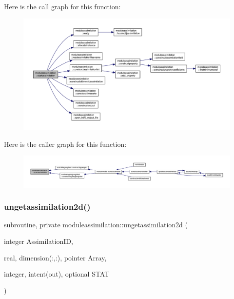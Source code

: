 Here is the call graph for this function\+:\nopagebreak
\begin{figure}[H]
\begin{center}
\leavevmode
\includegraphics[width=350pt]{namespacemoduleassimilation_a686ae542667f0f0269fb4baa108cbcf7_cgraph}
\end{center}
\end{figure}
Here is the caller graph for this function\+:\nopagebreak
\begin{figure}[H]
\begin{center}
\leavevmode
\includegraphics[width=350pt]{namespacemoduleassimilation_a686ae542667f0f0269fb4baa108cbcf7_icgraph}
\end{center}
\end{figure}
\mbox{\label{namespacemoduleassimilation_a3a9adb0b25404594ea0591b684a7c40e}} 
\subsubsection{\texorpdfstring{ungetassimilation2d()}{ungetassimilation2d()}}
{\footnotesize\ttfamily subroutine, private moduleassimilation\+::ungetassimilation2d (\begin{DoxyParamCaption}\item[{integer}]{Assimilation\+ID,  }\item[{real, dimension(\+:,\+:), pointer}]{Array,  }\item[{integer, intent(out), optional}]{S\+T\+AT }\end{DoxyParamCaption})\hspace{0.3cm}{\ttfamily [private]}}

